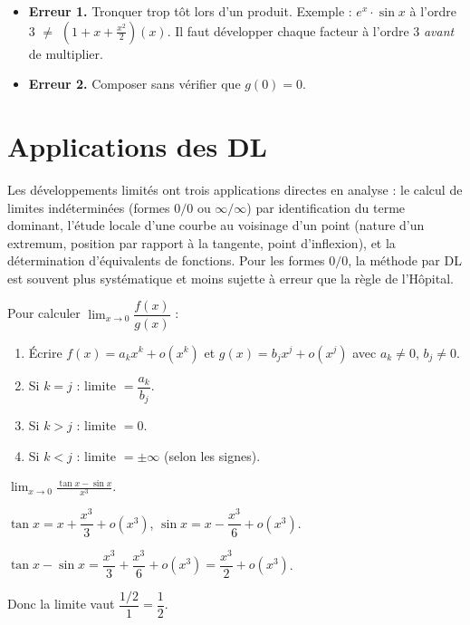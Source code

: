 \documentclass[11pt,a4paper,twoside]{book}
\begin{document}
\begin{erreurbox}
\begin{itemize}
  \item \textbf{Erreur 1.} Tronquer trop tôt lors d'un produit.
    Exemple : $e^x \cdot \sin x$ à l'ordre 3 $\neq$ $(1+x+\frac{x^2}{2})(x)$.
    Il faut développer chaque facteur à l'ordre 3 \emph{avant} de multiplier.
  \item \textbf{Erreur 2.} Composer sans vérifier que $g(0) = 0$.
\end{itemize}
\end{erreurbox}

\section{Applications des DL}

Les développements limités ont trois applications directes en analyse : le calcul de limites indéterminées (formes $0/0$ ou $\infty/\infty$) par identification du terme dominant, l'étude locale d'une courbe au voisinage d'un point (nature d'un extremum, position par rapport à la tangente, point d'inflexion), et la détermination d'équivalents de fonctions. Pour les formes $0/0$, la méthode par DL est souvent plus systématique et moins sujette à erreur que la règle de l'Hôpital.

\begin{methodebox}
Pour calculer $\lim_{x\to 0} \dfrac{f(x)}{g(x)}$ :
\begin{enumerate}
  \item Écrire $f(x) = a_k x^k + o(x^k)$ et $g(x) = b_j x^j + o(x^j)$ avec $a_k \neq 0$, $b_j \neq 0$.
  \item Si $k = j$ : limite $= \dfrac{a_k}{b_j}$.
  \item Si $k > j$ : limite $= 0$.
  \item Si $k < j$ : limite $= \pm\infty$ (selon les signes).
\end{enumerate}
\end{methodebox}

\begin{exemplebox}
$\displaystyle\lim_{x\to 0} \frac{\tan x - \sin x}{x^3}$.

$\tan x = x + \dfrac{x^3}{3} + o(x^3)$, $\sin x = x - \dfrac{x^3}{6} + o(x^3)$.

$\tan x - \sin x = \dfrac{x^3}{3} + \dfrac{x^3}{6} + o(x^3) = \dfrac{x^3}{2} + o(x^3)$.

Donc la limite vaut $\dfrac{1/2}{1} = \dfrac{1}{2}$.
\end{exemplebox}
\end{document}
